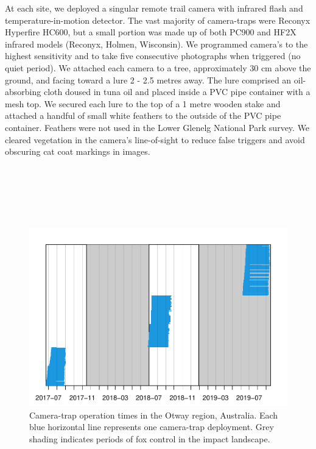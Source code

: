 \documentclass[11pt,a4paper,titlepage,twoside,openright]{style/unimelbthesis}
\begin{document}
\begin{mainmatter}
At each site, we deployed a singular remote trail camera with infrared flash and temperature-in-motion detector. The vast majority of camera-traps were Reconyx Hyperfire HC600, but a small portion was made up of both PC900 and HF2X infrared models (Reconyx, Holmen, Wisconsin). We programmed camera's to the highest sensitivity and to take five consecutive photographs when triggered (no quiet period). We attached each camera to a tree, approximately 30 cm above the ground, and facing toward a lure 2 - 2.5 metres away. The lure comprised an oil-absorbing cloth doused in tuna oil and placed inside a PVC pipe container with a mesh top. We secured each lure to the top of a 1 metre wooden stake and attached a handful of small white feathers to the outside of the PVC pipe container. Feathers were not used in the Lower Glenelg National Park survey. We cleared vegetation in the camera's line-of-sight to reduce false triggers and avoid obscuring cat coat markings in images.

\newpage

\(~\)

\(~\)

\(~\)
\begin{figure}

{\centering \includegraphics[width=1\linewidth]{figure/density-camop-1} 

}

\caption{Camera-trap operation times in the Otway region, Australia. Each blue horizontal line represents one camera-trap deployment. Grey shading indicates periods of fox control in the impact landscape.}\label{fig:density-camop}
\end{figure}
\newpage


\end{mainmatter}
\end{document}
